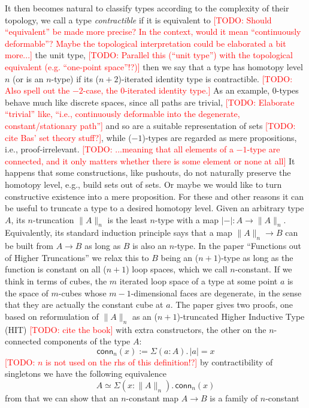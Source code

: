 \documentclass{book}
\newcommand{\TODO}[1]{\textcolor{red}{[TODO: #1]}}
\newcommand{\tr}[2]{\| #2 \|_{#1}}
\newcommand{\trcon}[1]{| #1 |}
\newcommand{\conn}{\mathsf{conn}}
\newcommand{\sd}{.\,}
\begin{document}
It then becomes natural to classify types according to the complexity
of their topology, we call a type \emph{contractible} if it is
equivalent to \TODO{Should ``equivalent'' be made more precise?  In
  the context, would it mean ``continuously deformable''?  Maybe the
  topological interpretation could be elaborated a bit more...}
the unit type, \TODO{Parallel this (``unit type'') with the
  topological equivalent (e.g. ``one-point space''!?)}
then we say that a type has homotopy level $n$ (or is an
$n$-type) if its ($n{+}2$)-iterated identity type is contractible.
\TODO{Also spell out the $-2$-case, the $0$-iterated identity type.}
As an example,
$0$-types behave much like discrete spaces, since all paths are
trivial, \TODO{Elaborate ``trivial'' like, ``i.e., continuously
  deformable into the degenerate, constant/stationary path''}
and so are a suitable representation of sets \TODO{cite Bas' set theory stuff?},
while ($-1$)-types are regarded as mere propositions, i.e.,
proof-irrelevant. \TODO{...meaning that all elements of a $-1$-type are
  connected, and it only matters whether there is some element or none
  at all}
It happens that some constructions, like pushouts, do not naturally
preserve the homotopy level, e.g., build sets out of sets.  Or maybe we
would like to turn constructive existence into a mere proposition.  For
these and other reasons it can be useful to truncate a type to a
desired homotopy level.
Given an arbitrary type $A$, its $n$-truncation $\tr{n}{A}$ is the least
$n$-type with a map $\trcon{{-}} : A \to \tr{n}{A}$.  Equivalently, its standard
induction principle says that a map $\tr{n}{A} \to B$ can be built
from $A \to B$ as long as $B$ is also an $n$-type.
In the paper ``Functions out of Higher Truncations'' we relax this to
$B$ being an ($n{+}1$)-type as long as the function is constant on all
($n{+}1$) loop spaces, which we call $n$-constant.
If we think in terms of cubes, the $m$ iterated loop space of a type at some point $a$
is the space of $m$-cubes whose $m{-}1$-dimensional faces are
degenerate, in the sense that they are actually the constant cube at $a$.
The paper gives two proofs, one based on reformulation of $\tr{n}{A}$
as an ($n{+}1$)-truncated Higher Inductive Type (HIT) \TODO{cite the book}
with extra constructors, the other on the
$n$-connected components of the type $A$:
\[
\conn_n(x) := \Sigma (a : A)\sd \trcon{a} = x
\]
\TODO{$n$ is not used on the rhs of this definition!?}
by contractibility of singletons we have the following equivalence
\[
A \simeq \Sigma (x : \tr{n}{A})\sd \conn_n(x)
\]
from that we can show that an $n$-constant map $A \to B$ is a family of $n$-constant
\end{document}
